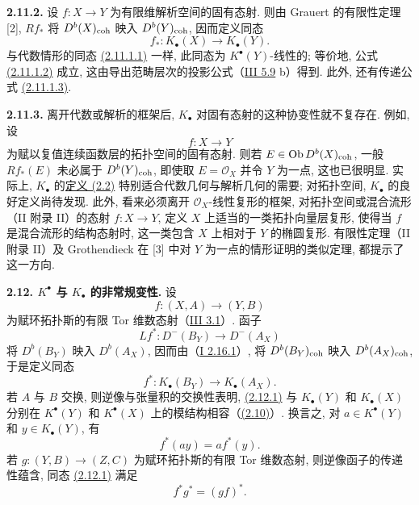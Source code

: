 \textbf{2.11.2.} 设 \(f:X\to Y\) 为有限维解析空间的固有态射. 则由 Grauert 的有限性定理 [2], \(Rf_*\) 将 \(D^b(X)_{\operatorname{coh}}\) 映入 \(D^b(Y)_{\operatorname{coh}}\), 因而定义同态
\begin{equation}\tag{2.11.2.1}
 f_*:K_{\bullet}(X)\longrightarrow K_{\bullet}(Y).
\end{equation}
与代数情形的同态 \hyperlink{sga6.e04.eq.2-11-1-1}{(2.11.1.1)} 一样, 此同态为 \(K^{\bullet}(Y)\)-线性的; 等价地, 公式 \hyperlink{sga6.e04.eq.2-11-1-2}{(2.11.1.2)} 成立, 这由导出范畴层次的投影公式（\hyperlink{sga6.e03.rem.5-8}{III 5.9} b）得到. 此外, 还有传递公式 \hyperlink{sga6.e04.eq.2-11-1-3}{(2.11.1.3)}.

\textbf{2.11.3.} 离开代数或解析的框架后, \(K_{\bullet}\) 对固有态射的这种协变性就不复存在. 例如, 设
\[
 f:X\to Y
\]
为赋以复值连续函数层的拓扑空间的固有态射. 则若 \(E\in\operatorname{Ob} D^b(X)_{\operatorname{coh}}\), 一般 \(Rf_*(E)\) 未必属于 \(D^b(Y)_{\operatorname{coh}}\), 即使取 \(E=\mathcal O_X\) 并令 \(Y\) 为一点, 这也已很明显. 实际上, \(K_{\bullet}\) 的\hyperlink{sga6.e04.def.2-2}{定义 (2.2)} 特别适合代数几何与解析几何的需要; 对拓扑空间, \(K_{\bullet}\) 的良好定义尚待发现. 此外, 看来必须离开 \(\mathcal O_X\)-线性复形的框架, 对拓扑空间或混合流形（II 附录 II）的态射 \(f:X\to Y\), 定义 \(X\) 上适当的一类拓扑向量层复形, 使得当 \(f\) 是混合流形的结构态射时, 这一类包含 \(X\) 上相对于 \(Y\) 的椭圆复形. 有限性定理（II 附录 II）及 Grothendieck 在 [3] 中对 \(Y\) 为一点的情形证明的类似定理, 都提示了这一方向.

\textbf{2.12. \(K^{\bullet}\) 与 \(K_{\bullet}\) 的非常规变性.} 设
\[
 f:(X,A)\longrightarrow(Y,B)
\]
为赋环拓扑斯的有限 Tor 维数态射（\hyperlink{sga6.e03.def.3-1}{III 3.1}）. 函子
\[
 Lf^*:D^-(B_Y)\longrightarrow D^-(A_X)
\]
将 \(D^b(B_Y)\) 映入 \(D^b(A_X)\), 因而由（\hyperlink{sga6.e01.cor.2-16-1}{I 2.16.1}）, 将 \(D^b(B_Y)_{\operatorname{coh}}\) 映入 \(D^b(A_X)_{\operatorname{coh}}\), 于是定义同态
\begin{equation}\tag{2.12.1}
 f^*:K_{\bullet}(B_Y)\longrightarrow K_{\bullet}(A_X).
\end{equation}
若 \(A\) 与 \(B\) 交换, 则逆像与张量积的交换性表明, \hyperlink{sga6.e04.eq.2-12-1}{(2.12.1)} 与 \(K_{\bullet}(Y)\) 和 \(K_{\bullet}(X)\) 分别在 \(K^{\bullet}(Y)\) 和 \(K^{\bullet}(X)\) 上的模结构相容（\hyperlink{sga6.e04.para.2-10}{(2.10)}）. 换言之, 对 \(a\in K^{\bullet}(Y)\) 和 \(y\in K_{\bullet}(Y)\), 有
\begin{equation}\tag{2.12.2}
 f^*(ay)=a f^*(y).
\end{equation}
若 \(g:(Y,B)\to(Z,C)\) 为赋环拓扑斯的有限 Tor 维数态射, 则逆像函子的传递性蕴含, 同态 \hyperlink{sga6.e04.eq.2-12-1}{(2.12.1)} 满足
\begin{equation}\tag{2.12.1.1}
 f^*g^*=(gf)^*.
\end{equation}

